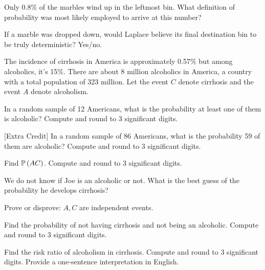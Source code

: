 \documentclass[12pt]{article}
\begin{document}
Only 0.8\% of the marbles wind up in the leftmost bin. What definition of probability was most likely employed to arrive at this number? 

 If a marble was dropped down, would Laplace believe its final destination bin to be truly deterministic? Yes/no. 


\eenum

\problem The incidence of cirrhosis in America is approximately 0.57\% but among alcoholics, it's 15\%. There are about 8 million alcoholics in America, a country with a total population of 323 million. Let the event $C$ denote cirrhosis and the event $A$ denote alcoholism.

\benum
{} In a random sample of 12 Americans, what is the probability at least one of them is alcoholic? Compute and round to 3 significant digits. 

 [Extra Credit] In a random sample of 86 Americans, what is the probability 59 of them are alcoholic? Compute and round to 3 significant digits. 

 Find $\mathbb{P}\left(AC\right)$. Compute and round to 3 significant digits. 

 We do not know if Joe is an alcoholic or not. What is the best guess of the probability he develops cirrhosis? 

 Prove or disprove: $A, C$ are independent events. 

 Find the probability of not having cirrhosis and not being an alcoholic. Compute and round to 3 significant digits. 

 Find the risk ratio of alcoholism in cirrhosis. Compute and round to 3 significant digits. Provide a one-sentence interpretation in English. 


\eenum
\end{document}
